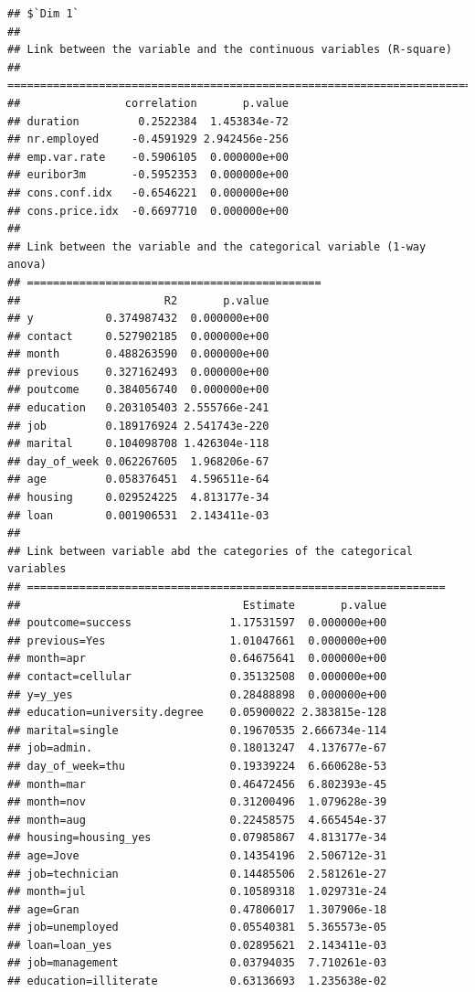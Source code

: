 \documentclass[
]{article}
\begin{document}
\begin{verbatim}
## $`Dim 1`
## 
## Link between the variable and the continuous variables (R-square)
## =================================================================================
##                correlation       p.value
## duration         0.2522384  1.453834e-72
## nr.employed     -0.4591929 2.942456e-256
## emp.var.rate    -0.5906105  0.000000e+00
## euribor3m       -0.5952353  0.000000e+00
## cons.conf.idx   -0.6546221  0.000000e+00
## cons.price.idx  -0.6697710  0.000000e+00
## 
## Link between the variable and the categorical variable (1-way anova)
## =============================================
##                      R2       p.value
## y           0.374987432  0.000000e+00
## contact     0.527902185  0.000000e+00
## month       0.488263590  0.000000e+00
## previous    0.327162493  0.000000e+00
## poutcome    0.384056740  0.000000e+00
## education   0.203105403 2.555766e-241
## job         0.189176924 2.541743e-220
## marital     0.104098708 1.426304e-118
## day_of_week 0.062267605  1.968206e-67
## age         0.058376451  4.596511e-64
## housing     0.029524225  4.813177e-34
## loan        0.001906531  2.143411e-03
## 
## Link between variable abd the categories of the categorical variables
## ================================================================
##                                  Estimate       p.value
## poutcome=success               1.17531597  0.000000e+00
## previous=Yes                   1.01047661  0.000000e+00
## month=apr                      0.64675641  0.000000e+00
## contact=cellular               0.35132508  0.000000e+00
## y=y_yes                        0.28488898  0.000000e+00
## education=university.degree    0.05900022 2.383815e-128
## marital=single                 0.19670535 2.666734e-114
## job=admin.                     0.18013247  4.137677e-67
## day_of_week=thu                0.19339224  6.660628e-53
## month=mar                      0.46472456  6.802393e-45
## month=nov                      0.31200496  1.079628e-39
## month=aug                      0.22458575  4.665454e-37
## housing=housing_yes            0.07985867  4.813177e-34
## age=Jove                       0.14354196  2.506712e-31
## job=technician                 0.14485506  2.581261e-27
## month=jul                      0.10589318  1.029731e-24
## age=Gran                       0.47806017  1.307906e-18
## job=unemployed                 0.05540381  5.365573e-05
## loan=loan_yes                  0.02895621  2.143411e-03
## job=management                 0.03794035  7.710261e-03
## education=illiterate           0.63136693  1.235638e-02

\end{verbatim}
\end{document}
